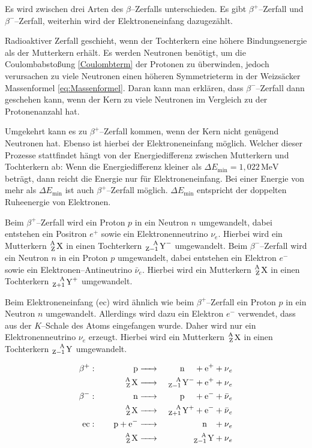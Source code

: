 \documentclass[12pt,a4paper]{scrartcl}
\numberwithin{equation}{section} %
\newcommand{\pu}[1]{\ensuremath{\mathrm{#1}}}
\begin{document}
Es wird zwischen drei Arten des $\beta$--Zerfalls unterschieden. Es gibt $\beta^+$--Zerfall und $\beta^-$--Zerfall, weiterhin wird der Elektroneneinfang dazugezählt.

Radioaktiver Zerfall geschieht, wenn der Tochterkern eine höhere Bindungsenergie als der Mutterkern erhält. Es werden Neutronen benötigt, um die Coulombabstoßung \eqref{Coulombterm} der Protonen zu überwinden, jedoch verursachen zu viele Neutronen einen höheren Symmetrieterm in der Weizsäcker Massenformel \eqref{eq:Massenformel}. Daran kann man erklären, dass $\beta^-$--Zerfall dann geschehen kann, wenn der Kern zu viele Neutronen im Vergleich zu der Protonenanzahl hat.

Umgekehrt kann es zu $\beta^+$--Zerfall kommen, wenn der Kern nicht genügend Neutronen hat. Ebenso ist hierbei der Elektroneneinfang möglich. Welcher dieser Prozesse stattfindet hängt von der Energiedifferenz zwischen Mutterkern und Tochterkern ab: Wenn die Energiedifferenz kleiner als $\Delta E_\mathrm{min}=\pu{1,022\, MeV}$ beträgt, dann reicht die Energie nur für Elektroneneinfang. Bei einer Energie von mehr als $\Delta E_\mathrm{min}$ ist auch $\beta^+$--Zerfall möglich. $\Delta E_\mathrm{min}$ entspricht der doppelten Ruheenergie von Elektronen.

Beim $\beta^+$--Zerfall wird ein Proton $p$ in ein Neutron $n$ umgewandelt, dabei entstehen ein Positron $e^+$ sowie ein Elektronenneutrino $\nu_e$. Hierbei wird ein Mutterkern $\ce{^A_Z X}$ in einen Tochterkern $\ce{^A_{Z-1} Y^-}$ umgewandelt. Beim $\beta^-$--Zerfall wird ein Neutron $n$ in ein Proton $p$ umgewandelt, dabei entstehen ein Elektron $e^-$ sowie ein Elektronen--Antineutrino $\bar{\nu}_e$. Hierbei wird ein Mutterkern $\ce{^A_Z X}$ in einen Tochterkern $\ce{^A_{Z+1} Y^+}$ umgewandelt.

Beim Elektroneneinfang (ec) wird ähnlich wie beim $\beta^+$--Zerfall ein Proton $p$ in ein Neutron $n$ umgewandelt. Allerdings wird dazu ein Elektron $e^-$ verwendet, dass aus der $K$--Schale des Atoms eingefangen wurde. Daher wird nur ein Elektronenneutrino $\nu_e$ erzeugt. Hierbei wird ein Mutterkern $\ce{^A_Z X}$ in einen Tochterkern $\ce{^A_{Z-1} Y}$ umgewandelt.

\begin{eqnarray}
    \beta^+:\qquad\,\,\qquad
        \ce{p} &\ce{->}& \quad \ce{n} \quad\, + \ce{e^+} + \ce{\nu_e} \\
        \ce{^A_Z X} &\ce{->}& \ce{^A_{Z-1} Y^-} + \ce{e^+} + \ce{\nu_e} \\
    \beta^-:\qquad\,\,\qquad
        \ce{n} &\ce{->}& \quad \ce{p} \quad\, + \ce{e^-} + \ce{\bar{\nu}_e} \\
        \ce{^A_Z X} &\ce{->}& \ce{^A_{Z+1} Y^+} + \ce{e^-} + \ce{\bar{\nu}_e} \\
    \text{ec}:\qquad
        \ce{p + e^-} &\ce{->}& \quad \ce{n} \ \ \, + \ce{\nu_e} \\
        \ce{^A_Z X} &\ce{->}& \ce{^A_{Z-1} Y} + \ce{\nu_e}
\end{eqnarray}
\end{document}
